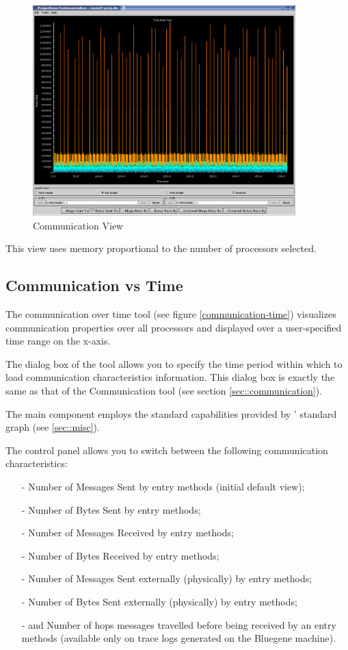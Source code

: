 \documentclass[10pt]{report}
\begin{document}
\begin{figure}[htb]
\center
\includegraphics[width=4.0in]{fig/apoa1_512_CommProcessorProfile}
\caption{Communication View}
\label{communication}
\end{figure}

This view uses memory proportional to the number of processors selected.

\subsection{Communication vs Time}

The communication over time tool (see figure \ref{communication-time})
visualizes communication properties over all processors and displayed
over a user-specified time range on the x-axis.

The dialog box of the tool allows you to specify the time period
within which to load communication characteristics information. This
dialog box is exactly the same as that of the Communication tool (see
section \ref{sec::communication}).

The main component employs the standard capabilities provided by
\projections{}' standard graph (see \ref{sec::misc}).

The control panel allows you to switch between the following
communication characteristics:

\begin{itemize}
\item[-] Number of Messages Sent by entry methods (initial default view);
\item[-] Number of Bytes Sent by entry methods;
\item[-] Number of Messages Received by entry methods;
\item[-] Number of Bytes Received by entry methods;
\item[-] Number of Messages Sent externally (physically) by entry methods;
\item[-] Number of Bytes Sent externally (physically) by entry methods;
\item[-] and Number of hops messages travelled before being received
by an entry methods (available only on trace logs generated on the
Bluegene machine).
\end{itemize}
\end{document}
